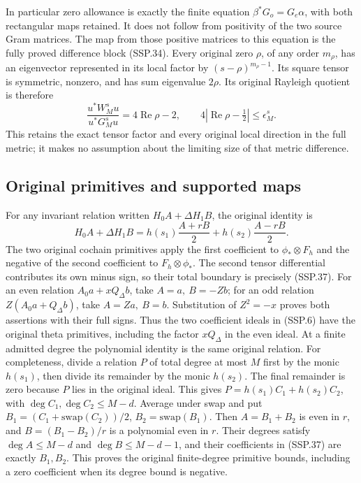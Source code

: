 In particular zero allowance is exactly the finite equation
\(\beta^*G_o=G_e\alpha\), with both rectangular maps retained.
It does not follow from positivity of the two source Gram
matrices.  The map from those positive matrices to this
equation is the fully proved difference block (SSP.34).
Every original zero \(\rho\), of any order \(m_\rho\), has
an eigenvector represented in its local factor by
\((s-\rho)^{m_\rho-1}\).  Its square tensor is symmetric,
nonzero, and has sum eigenvalue \(2\rho\).
Its original Rayleigh quotient is therefore
\[
 \frac{u^*W_M^su}{u^*G_M^su}=4\operatorname{Re}\rho-2,
 \qquad
 4\left|\operatorname{Re}\rho-\tfrac12\right|
       \le\epsilon_M^s .
 \tag{SSP.36}
\]
This retains the exact tensor factor and every original local
direction in the full metric; it makes no assumption about
the limiting size of that metric difference.

\subsection{Original primitives and supported maps}

For any invariant relation written
\(H_0A+\Delta H_1B\), the original identity is
\[
 H_0A+\Delta H_1B
  =h(s_1)\frac{A+rB}{2}
       +h(s_2)\frac{A-rB}{2}.
 \tag{SSP.37}
\]
The two original cochain primitives apply the first coefficient
to \(\phi_*\otimes F_h\) and the negative of the second
coefficient to \(F_h\otimes\phi_*\).
The second tensor differential contributes its own minus sign,
so their total boundary is precisely (SSP.37).
For an even relation \(A_0a+xQ_\Delta b\), take
\(A=a,\ B=-Zb\); for an odd relation
\(Z(A_0a+Q_\Delta b)\), take \(A=Za,\ B=b\).
Substitution of \(Z^2=-x\) proves both assertions with their
full signs.  Thus the two coefficient ideals in (SSP.6)
have the original theta primitives, including the factor
\(xQ_\Delta\) in the even ideal.  At a finite admitted
degree the polynomial identity is the same original relation.
For completeness, divide a relation \(P\) of total degree at most
\(M\) first by the monic \(h(s_1)\), then divide its remainder
by the monic \(h(s_2)\).  The final remainder is zero because
\(P\) lies in the original ideal.  This gives
\(P=h(s_1)C_1+h(s_2)C_2\), with
\(\deg C_1,\deg C_2\le M-d\).
Average under swap and put
\(B_1=(C_1+\mathrm{swap}(C_2))/2\), \(B_2=\mathrm{swap}(B_1)\).
Then \(A=B_1+B_2\) is even in \(r\), and
\(B=(B_1-B_2)/r\) is a polynomial even in \(r\).
Their degrees satisfy \(\deg A\le M-d\) and
\(\deg B\le M-d-1\), and their coefficients in (SSP.37)
are exactly \(B_1,B_2\).
This proves the original finite-degree primitive bounds,
including a zero coefficient when its degree bound is negative.

